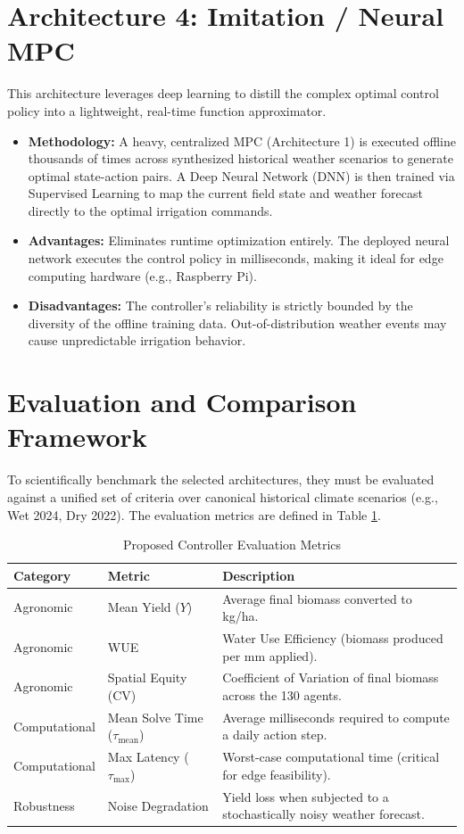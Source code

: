 \documentclass[12pt, a4paper]{article}
\begin{document}
\section{Architecture 4: Imitation / Neural MPC}
\label{sec:imitation}
This architecture leverages deep learning to distill the complex optimal control policy into a lightweight, real-time function approximator.

\begin{itemize}
    \item \textbf{Methodology:} A heavy, centralized MPC (Architecture 1) is executed offline thousands of times across synthesized historical weather scenarios to generate optimal state-action pairs. A Deep Neural Network (DNN) is then trained via Supervised Learning to map the current field state and weather forecast directly to the optimal irrigation commands.
    \item \textbf{Advantages:} Eliminates runtime optimization entirely. The deployed neural network executes the control policy in milliseconds, making it ideal for edge computing hardware (e.g., Raspberry Pi).
    \item \textbf{Disadvantages:} The controller's reliability is strictly bounded by the diversity of the offline training data. Out-of-distribution weather events may cause unpredictable irrigation behavior.
\end{itemize}

\section{Evaluation and Comparison Framework}
\label{sec:evaluation}
To scientifically benchmark the selected architectures, they must be evaluated against a unified set of criteria over canonical historical climate scenarios (e.g., Wet 2024, Dry 2022). The evaluation metrics are defined in Table \ref{tab:metrics}.

\begin{table}[H]
\centering
\caption{Proposed Controller Evaluation Metrics}
\label{tab:metrics}
\begin{tabular}{@{}llp{8cm}@{}}
\toprule
\textbf{Category} & \textbf{Metric} & \textbf{Description} \\ \midrule
Agronomic & Mean Yield ($Y$) & Average final biomass converted to kg/ha. \\
Agronomic & WUE & Water Use Efficiency (biomass produced per mm applied). \\
Agronomic & Spatial Equity (CV) & Coefficient of Variation of final biomass across the 130 agents. \\
Computational & Mean Solve Time ($\tau_{\text{mean}}$) & Average milliseconds required to compute a daily action step. \\
Computational & Max Latency ($\tau_{\text{max}}$) & Worst-case computational time (critical for edge feasibility). \\
Robustness & Noise Degradation & Yield loss when subjected to a stochastically noisy weather forecast. \\ \bottomrule
\end{tabular}
\end{table}
\end{document}
